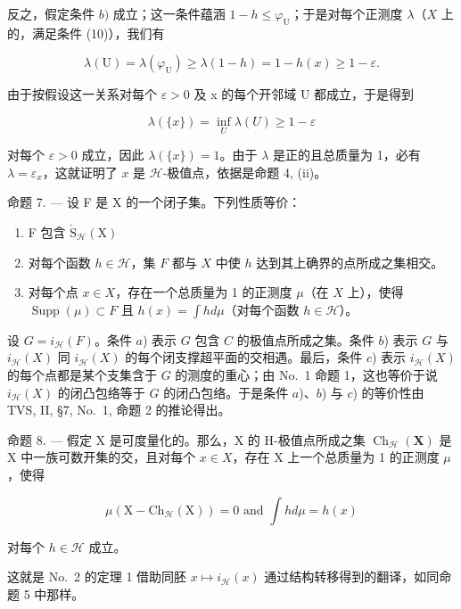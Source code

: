 反之，假定条件 \(b)\) 成立；这一条件蕴涵 \(1 - h \leqslant \varphi_{\mathrm{U}}\)；于是对每个正测度 \(\lambda\)（\(X\) 上的，满足条件 (10)），我们有

\[
\lambda (\mathrm{U}) = \lambda (\varphi_ {\mathrm{U}}) \geqslant \lambda (1 - h) = 1 - h (x) \geqslant 1 - \varepsilon .
\]

由于按假设这一关系对每个 \(\varepsilon > 0\) 及 x 的每个开邻域 U 都成立，于是得到

\[
\lambda (\{x \}) = \inf _ {U} \lambda (U) \geqslant 1 - \varepsilon
\]

对每个 \(\varepsilon > 0\) 成立，因此 \(\lambda(\{x\}) = 1\)。由于 \(\lambda\) 是正的且总质量为 1，必有 \(\lambda = \varepsilon_x\)，这就证明了 \(x\) 是 \(\mathcal{H}\)-极值点，依据是命题 4, (ii)。

命题 7. --- 设 F 是 X 的一个闭子集。下列性质等价：

\begin{enumerate}
\def\labelenumi{\alph{enumi})}
\item
  F 包含 \(\check{\mathrm{S}}_{\mathcal{H}}(\mathrm{X})\)
\item
  对每个函数 \(h \in \mathcal{H}\)，集 \(F\) 都与 \(X\) 中使 \(h\) 达到其上确界的点所成之集相交。
\item
  对每个点 \(x \in X\)，存在一个总质量为 1 的正测度 \(\mu\)（在 \(X\) 上），使得 \(\operatorname{Supp}(\mu) \subset F\) 且 \(h(x) = \int h d\mu\)（对每个函数 \(h \in \mathcal{H}\)）。
\end{enumerate}

设 \(G = i_{\mathcal{H}}(F)\)。条件 \(a\)) 表示 \(G\) 包含 \(C\) 的极值点所成之集。条件 \(b\)) 表示 \(G\) 与 \(i_{\mathcal{H}}(X)\) 同 \(i_{\mathcal{H}}(X)\) 的每个闭支撑超平面的交相遇。最后，条件 \(c\)) 表示 \(i_{\mathcal{H}}(X)\) 的每个点都是某个支集含于 \(G\) 的测度的重心；由 No.~1 命题 1，这也等价于说 \(i_{\mathcal{H}}(X)\) 的闭凸包络等于 \(G\) 的闭凸包络。于是条件 \(a\))、\(b\)) 与 \(c\)) 的等价性由 TVS, II, §7, No.~1, 命题 2 的推论得出。

命题 8. --- 假定 X 是可度量化的。那么，X 的 H-极值点所成之集 \(\operatorname{Ch}_{\mathcal{H}}(\mathbf{X})\) 是 X 中一族可数开集的交，且对每个 \(x \in X\)，存在 X 上一个总质量为 1 的正测度 \(\mu\)，使得

\[
\mu (\mathrm{X} - \mathrm{Ch} _ {\mathcal {H}} (\mathrm{X})) = 0 \text { and } \int h d \mu = h (x)
\]

对每个 \(h \in \mathcal{H}\) 成立。

这就是 No.~2 的定理 1 借助同胚 \(x \mapsto i_{\mathcal{H}}(x)\) 通过结构转移得到的翻译，如同命题 5 中那样。

